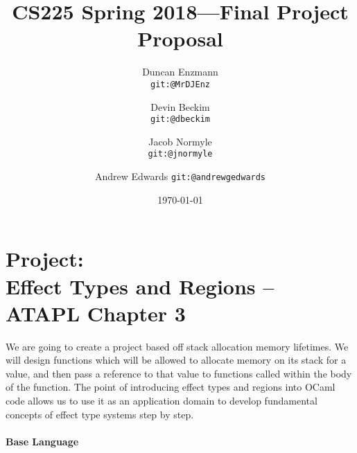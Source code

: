 \documentclass{article}
\title{CS225 Spring 2018---Final Project Proposal}
\author{
  Duncan Enzmann \\ \small{\texttt{git:@MrDJEnz}}
  \and Devin Beckim \\ \small{\texttt{git:@dbeckim}}
  \and Jacob Normyle \\ \small{\texttt{git:@jnormyle}}
  \and Andrew Edwards \small{\texttt{git:@andrewgedwards}}
}
\date{\today}
\begin{document}
\maketitle

\section*{Project: \\Effect Types and Regions --  ATAPL Chapter 3}

We are going to create a project based off stack allocation memory lifetimes. We will design functions which will be allowed to allocate memory on its stack for a value, and then pass a reference to that value to functions called within the body of the function. The point of introducing effect types and regions into OCaml code allows us to use it as an application domain to develop fundamental concepts of effect type systems step by step.

\paragraph{Base Language}
\end{document}
